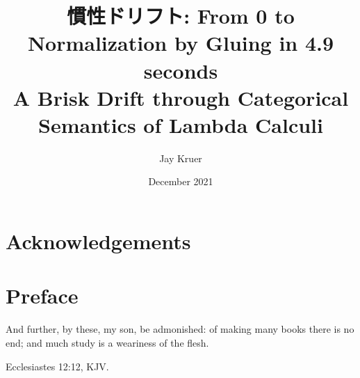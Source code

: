 \documentclass[12pt,twoside]{reedthesis}
\title{慣性ドリフト: From 0 to Normalization by Gluing in 4.9 seconds\\ A Brisk Drift through Categorical Semantics of Lambda Calculi}
\author{Jay Kruer}
\date{December 2021}
\theoremstyle{definition}
\theoremstyle{remark}
\theoremstyle{plain}
\begin{document}
\maketitle
\frontmatter %
\pagestyle{empty} %

\chapter*{Acknowledgements}








\chapter*{Preface}
\epigraph{And further, by these, my son, be admonished: of making many books
  there is no end; and much study is a weariness of the flesh.}{Ecclesiastes
  12:12, KJV.}
\end{document}
